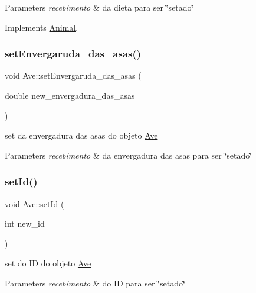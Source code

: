 \begin{DoxyParams}{Parameters}
{\em recebimento} & da dieta para ser \char`\"{}setado\char`\"{} \\
\hline
\end{DoxyParams}


Implements \mbox{\hyperlink{class_animal}{Animal}}.

\mbox{\label{class_ave_a64af70cf94d8f00ff6382c79b50bcc30}} 
\subsubsection{\texorpdfstring{setEnvergaruda\_das\_asas()}{setEnvergaruda\_das\_asas()}}
{\footnotesize\ttfamily void Ave\+::set\+Envergaruda\+\_\+das\+\_\+asas (\begin{DoxyParamCaption}\item[{double}]{new\+\_\+envergadura\+\_\+das\+\_\+asas }\end{DoxyParamCaption})}



set da envergadura das asas do objeto \mbox{\hyperlink{class_ave}{Ave}} 


\begin{DoxyParams}{Parameters}
{\em recebimento} & da envergadura das asas para ser \char`\"{}setado\char`\"{} \\
\hline
\end{DoxyParams}
\mbox{\label{class_ave_a2808ae17c4f0d0ab2bbdf34a1d6bc0c1}} 
\subsubsection{\texorpdfstring{setId()}{setId()}}
{\footnotesize\ttfamily void Ave\+::set\+Id (\begin{DoxyParamCaption}\item[{int}]{new\+\_\+id }\end{DoxyParamCaption})\hspace{0.3cm}{\ttfamily [virtual]}}



set do ID do objeto \mbox{\hyperlink{class_ave}{Ave}} 


\begin{DoxyParams}{Parameters}
{\em recebimento} & do ID para ser \char`\"{}setado\char`\"{} \\
\hline
\end{DoxyParams}


